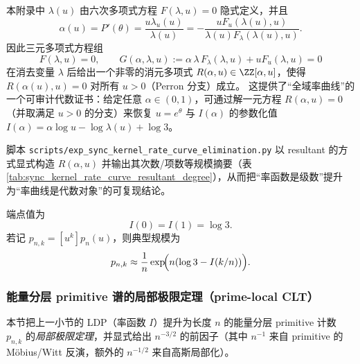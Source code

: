 \begin{remark}\label{rem:rate-algebraic-elimination}
本附录中 \(\lambda(u)\) 由六次多项式方程 \(F(\lambda,u)=0\) 隐式定义，并且
\[
\alpha(u)=P'(\theta)=\frac{u\lambda_u(u)}{\lambda(u)}
=-\frac{uF_u(\lambda(u),u)}{\lambda(u)F_\lambda(\lambda(u),u)}.
\]
因此三元多项式方程组
\[
F(\lambda,u)=0,\qquad
G(\alpha,\lambda,u):=\alpha\,\lambda\,F_\lambda(\lambda,u)+uF_u(\lambda,u)=0
\]
在消去变量 \(\lambda\) 后给出一个非零的消元多项式
\(
R(\alpha,u)\in\ZZ[\alpha,u]
\)，使得 \(R(\alpha(u),u)=0\) 对所有 \(u>0\)（Perron 分支）成立。
这提供了“全域率曲线”的一个可审计代数证书：给定任意 \(\alpha\in(0,1)\)，可通过解一元方程 \(R(\alpha,u)=0\)（并取满足 \(u>0\) 的分支）来恢复 \(u=e^\theta\) 与 \(I(\alpha)\) 的参数化值 \(I(\alpha)=\alpha\log u-\log\lambda(u)+\log 3\)。
\par
脚本 \texttt{scripts/exp\_sync\_kernel\_rate\_curve\_elimination.py} 以 resultant 的方式显式构造 \(R(\alpha,u)\) 并输出其次数/项数等规模摘要（表 \ref{tab:sync_kernel_rate_curve_resultant_degree}），从而把“率函数是级数”提升为“率曲线是代数对象”的可复现结论。
\end{remark}

端点值为
\[
I(0)=I(1)=\log 3.
\]
若记 $p_{n,k}=[u^k]p_n(u)$，则典型规模为
\[
p_{n,k}\approx \frac{1}{n}\exp\!\Bigl(n(\log 3-I(k/n))\Bigr).
\]

\subsubsection{能量分层 primitive 谱的局部极限定理（prime-local CLT）}\label{app:prime-local-clt}
本节把上一小节的 LDP（率函数 \(I\)）提升为长度 \(n\) 的能量分层 primitive 计数 \(p_{n,k}\) 的\emph{局部极限定理}，并显式给出 \(n^{-3/2}\) 的前因子（其中 \(n^{-1}\) 来自 primitive 的 Möbius/Witt 反演，额外的 \(n^{-1/2}\) 来自高斯局部化）。

